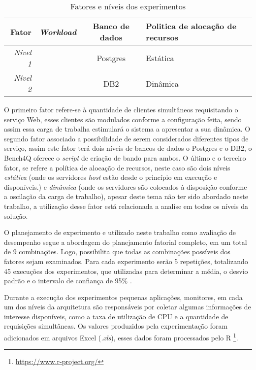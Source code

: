 \begin{table}[htb]
	\centering
	\caption{Fatores e níveis dos experimentos}
	\label{tab:fatores_niveis}
	\begin{tabularx}{\textwidth}{|r|c|c|X|} \hline\hline
		\textbf{Fator}		& \textbf{\textit{Workload}} & \textbf{Banco de dados}  & \textbf{Politica de alocação de recursos} \\ \hline
		\textit{Nível 1}	&							 & Postgres					& Estática									\\
		\textit{Nível 2}	&							 & DB2						& Dinâmica									\\		
		\hline
	\end{tabularx}
	\fdadospesquisa
\end{table}


O primeiro fator refere-se à quantidade de clientes simultâneos requisitando o serviço Web, esses clientes são modulados conforme a configuração feita, sendo assim essa carga de trabalha estimulará o sistema a apresentar a sua dinâmica. O segundo fator associado a possibilidade de serem considerados diferentes tipos de serviço, assim este fator terá dois níveis de bancos de dados o Postgres e o DB2, o Bench4Q oferece o \textit{script} de criação de bando para ambos. O último e o terceiro fator, se refere a política de alocação de recursos, neste caso são dois níveis \textit{estática} (onde os servidores \textit{host} estão desde o princípio em execução e disponíveis.) e \textit{dinâmica} (onde os servidores são colocados à disposição conforme a oscilação da carga de trabalho), apesar deste tema não ter sido abordado neste trabalho, a utilização desse fator está relacionada a analise em todos os níveis da solução.

O planejamento de experimento e utilizado neste trabalho como avaliação de desempenho segue a abordagem do planejamento fatorial completo, em um total de 9 combinações. Logo, possibilita que todas as combinações possíveis dos fatores sejam examinados. Para cada experimento serão 5 repetições, totalizando 45 execuções dos experimentos, que utilizadas para determinar a média, o desvio padrão e o intervalo de confiança de 95\% .

Durante a execução dos experimentos pequenas aplicações, monitores, em cada um dos níveis da arquitetura são responsáveis por coletar algumas informações de interesse disponíveis, como a taxa de utilização de CPU e a quantidade de requisições simultâneas. Os valores produzidos pela experimentação foram adicionados em arquivos Excel (\textit{.xls}), esses dados foram processados pelo R \footnote{\url{https://www.r-project.org/}}.
